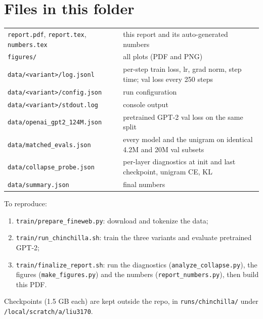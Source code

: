 \documentclass[11pt]{article}
\newcommand{\code}[1]{\texttt{#1}}
\begin{document}
\section*{Files in this folder}
{\small
\begin{tabularx}{\linewidth}{@{}lX@{}}
\code{report.pdf}, \code{report.tex}, \code{numbers.tex} & this report and its auto-generated numbers \\
\code{figures/} & all plots (PDF and PNG) \\
\code{data/<variant>/log.jsonl} & per-step train loss, lr, grad norm, step time; val loss every 250 steps \\
\code{data/<variant>/config.json} & run configuration \\
\code{data/<variant>/stdout.log} & console output \\
\code{data/openai\_gpt2\_124M.json} & pretrained GPT-2 val loss on the same split \\
\code{data/matched\_evals.json} & every model and the unigram on identical 4.2M and 20M val subsets \\
\code{data/collapse\_probe.json} & per-layer diagnostics at init and last checkpoint, unigram CE, KL \\
\code{data/summary.json} & final numbers \\
\end{tabularx}}

{\raggedright To reproduce:
\begin{enumerate}
\item \code{train/prepare\_fineweb.py}: download and tokenize the data;
\item \code{train/run\_chinchilla.sh}: train the three variants and evaluate pretrained GPT-2;
\item \code{train/finalize\_report.sh}: run the diagnostics (\code{analyze\_collapse.py}), the figures
(\code{make\_figures.py}) and the numbers (\code{report\_numbers.py}), then build this PDF.
\end{enumerate}
Checkpoints (1.5 GB each) are kept outside the repo, in \code{runs/chinchilla/} under
\code{/local/scratch/a/liu3170}.\par}
\end{document}
